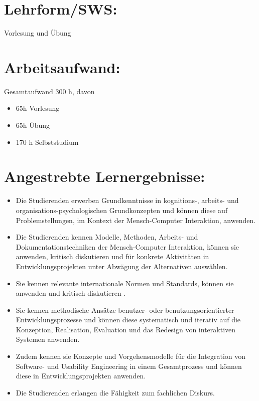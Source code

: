 \section*{Lehrform/SWS:}\label{lehrformsws-15}

Vorlesung und Übung

\section*{Arbeitsaufwand:}\label{arbeitsaufwand-14}

Gesamtaufwand 300 h, davon

\begin{itemize}
\tightlist
\item
  65h Vorlesung
\item
  65h Übung
\item
  170 h Selbststudium
\end{itemize}

\section*{Angestrebte
Lernergebnisse:}\label{angestrebte-lernergebnisse-15}

\begin{itemize}
\tightlist
\item
  Die Studierenden erwerben Grundkenntnisse in kognitions-, arbeits- und
  organisations-psychologischen Grundkonzepten und können diese auf
  Problemstellungen, im Kontext der Mensch-Computer Interaktion,
  anwenden.
\item
  Die Studierenden kennen Modelle, Methoden, Arbeits- und
  Dokumentationstechniken der Mensch-Computer Interaktion, können sie
  anwenden, kritisch diskutieren und für konkrete Aktivitäten in
  Entwicklungsprojekten unter Abwägung der Alternativen auswählen.
\item
  Sie kennen relevante internationale Normen und Standards, können sie
  anwenden und kritisch diskutieren .
\item
  Sie kennen methodische Ansätze benutzer- oder benutzungsorientierter
  Entwicklungsprozesse und können diese systematisch und iterativ auf
  die Konzeption, Realisation, Evaluation und das Redesign von
  interaktiven Systemen anwenden.
\item
  Zudem kennen sie Konzepte und Vorgehensmodelle für die Integration von
  Software- und Usability Engineering in einem Gesamtprozess und können
  diese in Entwicklungsprojekten anwenden.
\item
  Die Studierenden erlangen die Fähigkeit zum fachlichen Diskurs.
\end{itemize}

